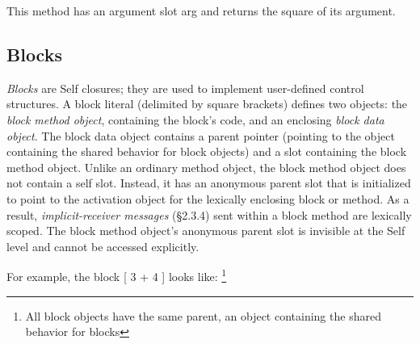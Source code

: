 \documentclass[letterpaper,10pt,english]{sphinxmanual}
\begin{document}
This method has an argument slot arg and returns the square of its argument.


\subsection{Blocks}
\label{langref:blocks}\label{langref:index-26}
\emph{Blocks} are Self closures; they are used to implement user-defined control structures. A block literal
(delimited by square brackets) defines two objects: the \emph{block method object}, containing the
block’s code, and an enclosing \emph{block data object}. The block data object contains a parent pointer
(pointing to the object containing the shared behavior for block objects) and a slot containing the
block method object. Unlike an ordinary method object, the block method object does not contain
a self slot. Instead, it has an anonymous parent slot that is initialized to point to the activation object
for the lexically enclosing block or method. As a result, \emph{implicit-receiver messages} (\S{}2.3.4)
sent within a block method are lexically scoped. The block method object’s anonymous parent slot
is invisible at the Self level and cannot be accessed explicitly.

For example, the block {[} 3 + 4 {]} looks like: \footnote{
All block objects have the same parent, an object containing the shared behavior for blocks
}
\begin{figure}[htbp]\begin{flushleft}

\end{flushleft}\end{figure}
\end{document}
